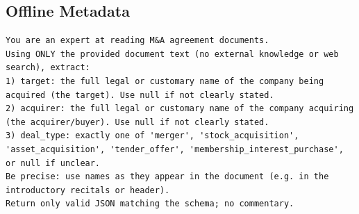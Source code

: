\documentclass[12pt]{article}
\begin{document}
{\begin{appendices}
\subsection{Offline Metadata}
\label{app:offline-metadata-prompt}
\begingroup
\singlespacing
\begin{verbatim}
You are an expert at reading M&A agreement documents.
Using ONLY the provided document text (no external knowledge or web search), extract:
1) target: the full legal or customary name of the company being acquired (the target). Use null if not clearly stated.
2) acquirer: the full legal or customary name of the company acquiring (the acquirer/buyer). Use null if not clearly stated.
3) deal_type: exactly one of 'merger', 'stock_acquisition', 'asset_acquisition', 'tender_offer', 'membership_interest_purchase', or null if unclear.
Be precise: use names as they appear in the document (e.g. in the introductory recitals or header).
Return only valid JSON matching the schema; no commentary.
\end{verbatim}
\endgroup


\end{appendices}}
\end{document}
